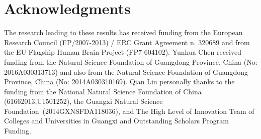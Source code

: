 \documentclass[runningheads,a4paper]{llncs}
\begin{document}
\section*{Acknowledgments}
The research leading to these results has received funding from the European Research Council 
(FP/2007-2013) / ERC Grant Agreement n. 320689 and from the EU Flagship Human Brain Project (FP7-604102). 
Yunhua Chen received funding from the Natural Science Foundation of Guangdong Province, China (No: 2016A030313713) and also from  the Natural Science Foundation of Guangdong Province, China (No: 2014A030310169).
Qian Liu personally thanks to the funding from the National Natural Science Foundation of China (61662013,U1501252), the Guangxi Natural Science Foundation~(2014GXNSFDA118036), and The High Level of Innovation Team of Colleges and Universities in Guangxi and Outstanding Scholars Program Funding.


\end{document}
